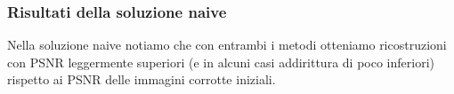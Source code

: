 {\color{oorange}\subsubsection{Risultati della soluzione naive}}
Nella soluzione naive notiamo che con entrambi i metodi otteniamo ricostruzioni con PSNR leggermente 
superiori (e in alcuni casi addirittura di poco inferiori) rispetto ai PSNR delle immagini corrotte iniziali.
